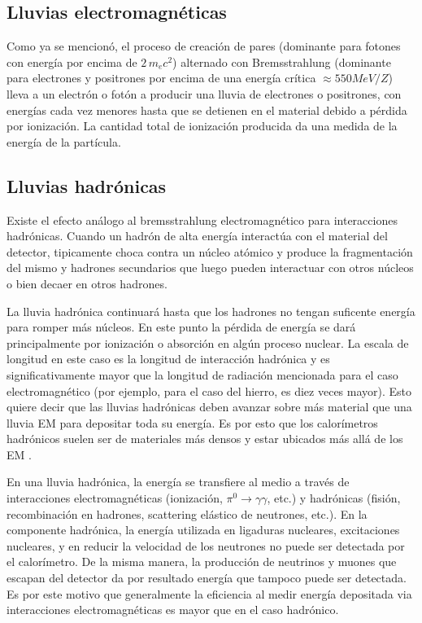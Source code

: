 \subsection{Lluvias electromagnéticas}
 Como ya se mencionó, el proceso de creación de pares (dominante para fotones con energía por encima de $2\,m_ec^2$) alternado con Bremsstrahlung (dominante para electrones y positrones por encima de una energía crítica $\approx 550 MeV/Z$) lleva a un electrón o fotón a producir una lluvia de electrones o positrones, con energías cada vez menores hasta que se detienen en el material debido a pérdida por ionización. La cantidad total de ionización producida da una medida de la energía de la partícula.
 
 \subsection{Lluvias hadrónicas}\label{Lluvias}
 Existe el efecto análogo al bremsstrahlung electromagnético para interacciones  hadrónicas. Cuando un hadrón de alta energía interactúa con el material del detector, tipicamente choca contra un núcleo atómico y produce la fragmentación del mismo y hadrones secundarios que luego pueden interactuar con otros núcleos o bien decaer en otros hadrones.
 
 La lluvia hadrónica continuará hasta que los hadrones no tengan suficente energía para romper más núcleos. En este punto la pérdida de energía se dará principalmente por ionización o absorción en algún proceso nuclear\cite{DetectorBook6}. La escala de longitud en este caso es la longitud de interacción hadrónica y es significativamente mayor que la longitud de radiación mencionada para el caso electromagnético (por ejemplo, para el caso del hierro, es diez veces mayor). Esto quiere decir que las lluvias hadrónicas deben avanzar sobre más material que una lluvia EM para depositar toda su energía. Es por esto que los calorímetros hadrónicos suelen ser de materiales más densos y estar ubicados más allá de los EM \cite{Instrumentation}.
 
 En una lluvia hadrónica, la energía se transfiere al medio a través de interacciones electromagnéticas (ionización, $\pi^0 \rightarrow \gamma\gamma$, etc.) y hadrónicas (fisión, recombinación en hadrones, scattering elástico de neutrones, etc.). En la componente hadrónica, la energía utilizada en ligaduras nucleares, excitaciones nucleares, y en reducir la velocidad de los neutrones no puede ser detectada por el calorímetro. De la misma manera, la producción de neutrinos y muones que escapan del detector da por resultado energía que tampoco puede ser detectada. Es por este motivo que generalmente la eficiencia al medir energía depositada via interacciones electromagnéticas es mayor que en el caso hadrónico. 
 